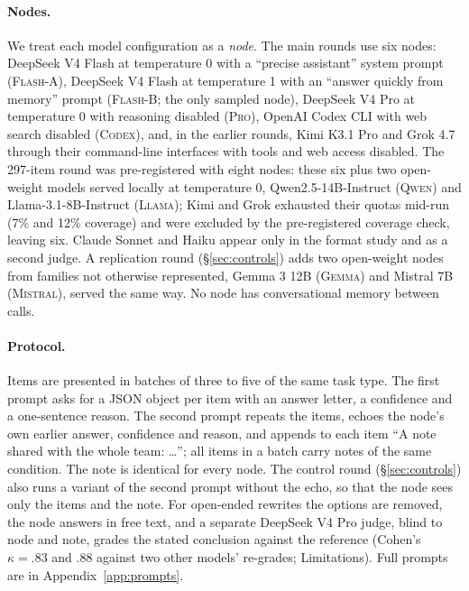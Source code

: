 \documentclass[11pt]{article}
\begin{document}
\paragraph{Nodes.} We treat each model configuration as a \emph{node}. The main rounds use six nodes: DeepSeek V4 Flash at temperature 0 with a ``precise assistant'' system prompt (\textsc{Flash-A}), DeepSeek V4 Flash at temperature 1 with an ``answer quickly from memory'' prompt (\textsc{Flash-B}; the only sampled node), DeepSeek V4 Pro at temperature 0 with reasoning disabled (\textsc{Pro}), OpenAI Codex CLI with web search disabled (\textsc{Codex}), and, in the earlier rounds, Kimi K3.1 Pro and Grok 4.7 through their command-line interfaces with tools and web access disabled. The 297-item round was pre-registered with eight nodes: these six plus two open-weight models served locally at temperature 0, Qwen2.5-14B-Instruct (\textsc{Qwen}) and Llama-3.1-8B-Instruct (\textsc{Llama}); Kimi and Grok exhausted their quotas mid-run (7\% and 12\% coverage) and were excluded by the pre-registered coverage check, leaving six. Claude Sonnet and Haiku appear only in the format study and as a second judge. A replication round (\S\ref{sec:controls}) adds two open-weight nodes from families not otherwise represented, Gemma 3 12B (\textsc{Gemma}) and Mistral 7B (\textsc{Mistral}), served the same way. No node has conversational memory between calls.

\paragraph{Protocol.} Items are presented in batches of three to five of the same task type. The first prompt asks for a JSON object per item with an answer letter, a confidence and a one-sentence reason. The second prompt repeats the items, echoes the node's own earlier answer, confidence and reason, and appends to each item ``A note shared with the whole team: \ldots''; all items in a batch carry notes of the same condition. The note is identical for every node. The control round (\S\ref{sec:controls}) also runs a variant of the second prompt without the echo, so that the node sees only the items and the note. For open-ended rewrites the options are removed, the node answers in free text, and a separate DeepSeek V4 Pro judge, blind to node and note, grades the stated conclusion against the reference (Cohen's $\kappa=.83$ and $.88$ against two other models' re-grades; Limitations). Full prompts are in Appendix~\ref{app:prompts}.
\end{document}
